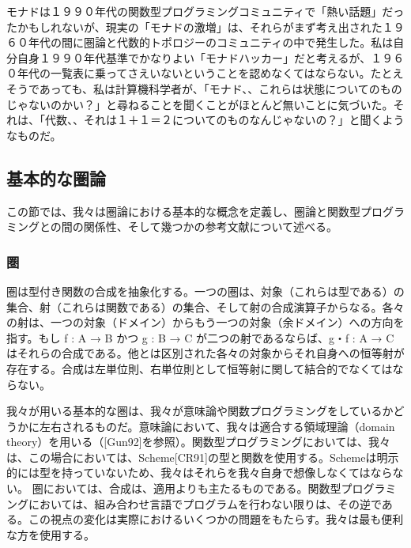 \documentclass[11pt, oneside]{jsarticle}   	%
\begin{document}
モナドは１９９０年代の関数型プログラミングコミュニティで「熱い話題」だったかもしれないが、現実の「モナドの激増」は、それらがまず考え出された１９６０年代の間に圏論と代数的トポロジーのコミュニティの中で発生した。私は自分自身１９９０年代基準でかなりよい「モナドハッカー」だと考えるが、１９６０年代の一覧表に乗ってさえいないということを認めなくてはならない。たとえそうであっても、私は計算機科学者が、「モナド、、これらは状態についてのものじゃないのかい？」と尋ねることを聞くことがほとんど無いことに気づいた。それは、「代数、、それは１＋１＝２についてのものなんじゃないの？」と聞くようなものだ。

\subsection{基本的な圏論}
この節では、我々は圏論における基本的な概念を定義し、圏論と関数型プログラミングとの間の関係性、そして幾つかの参考文献について述べる。

\subsubsection{ 圏 }
圏は型付き関数の合成を抽象化する。一つの圏は、対象（これらは型である）の集合、射（これらは関数である）の集合、そして射の合成演算子からなる。各々の射は、一つの対象（ドメイン）からもう一つの対象（余ドメイン）への方向を指す。もし f : A → B かつ g : B → C が二つの射であるならば、g・f : A → C はそれらの合成である。他とは区別された各々の対象からそれ自身への恒等射が存在する。合成は左単位則、右単位則として恒等射に関して結合的でなくてはならない。

我々が用いる基本的な圏は、我々が意味論や関数プログラミングをしているかどうかに左右されるものだ。意味論において、我々は適合する領域理論（domain theory）を用いる（[Gun92]を参照）。関数型プログラミングにおいては、我々は、この場合においては、Scheme[CR91]の型と関数を使用する。Schemeは明示的には型を持っていないため、我々はそれらを我々自身で想像しなくてはならない。
圏においては、合成は、適用よりも主たるものである。関数型プログラミングにおいては、組み合わせ言語でプログラムを行わない限りは、その逆である。この視点の変化は実際におけるいくつかの問題をもたらす。我々は最も便利な方を使用する。
\end{document}
